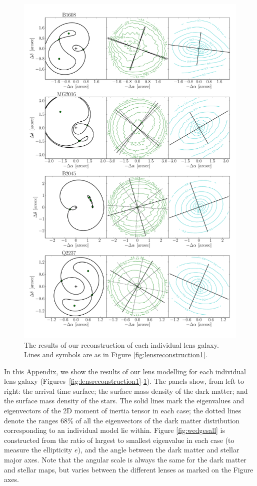 \documentclass[useAMS,usenatbib]{mn2e}
\begin{document}
\begin{figure}
  \centering
  \includegraphics[width=.8\linewidth]{Figures/AllLenses33.pdf}
  \caption[width=.65\linewidth]{The results of our reconstruction of each individual lens galaxy. Lines and symbols are as in Figure \ref{fig:lensreconstruction1}.}
  \label{fig:lensreconstruction3}
\end{figure}

In this Appendix, we show the results of our lens modelling for each individual lens galaxy (Figures~\ref{fig:lensreconstruction1}-\ref{fig:lensreconstruction3}). The panels show, from left to right: the arrival time surface; the surface mass density of the dark matter; and the surface mass density of the stars. The solid lines mark the eigenvalues and eigenvectors of the 2D moment of inertia tensor in each case; the dotted lines denote the ranges 68\% of all the eigenvectors of the dark matter distribution corresponding to an individual model lie within. Figure \ref{fig:wedgesall} is constructed from the ratio of largest to smallest eigenvalue in each case (to measure the ellipticity $e$), and the angle between the dark matter and stellar major axes. Note that the angular scale is always the same for the dark matter and stellar maps, but varies between the different lenses as marked on the Figure axes.
\end{document}

